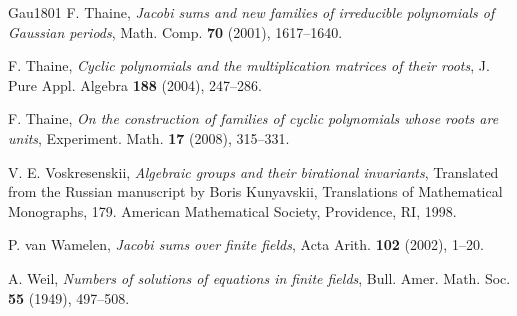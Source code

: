 \documentclass[a4paper, 11pt]{amsart}
\theoremstyle{plain}
\theoremstyle{definition}
\numberwithin{equation}{section}
\begin{document}
\begin{thebibliography}{Gau1801}
F. Thaine, 
\textit{Jacobi sums and new families of irreducible polynomials of Gaussian periods},
Math. Comp. \textbf{70} (2001), 1617--1640.

F. Thaine, 
\textit{Cyclic polynomials and the multiplication matrices of their roots},
J. Pure Appl. Algebra \textbf{188} (2004), 247--286.

F. Thaine, 
{\it On the construction of families of cyclic polynomials whose roots 
are units},
Experiment. Math. \textbf{17} (2008), 315--331.

V. E. Voskresenskii, 
{\it Algebraic groups and their birational invariants}, 
Translated from the Russian manuscript by Boris Kunyavskii, 
Translations of Mathematical Monographs, 179. 
American Mathematical Society, Providence, RI, 1998.

P. van Wamelen, 
\textit{Jacobi sums over finite fields},
Acta Arith. \textbf{102} (2002), 1--20.

A. Weil, 
{\it Numbers of solutions of equations in finite fields}, 
Bull. Amer. Math. Soc. \textbf{55} (1949), 497--508. 
\end{thebibliography}
\end{document}
